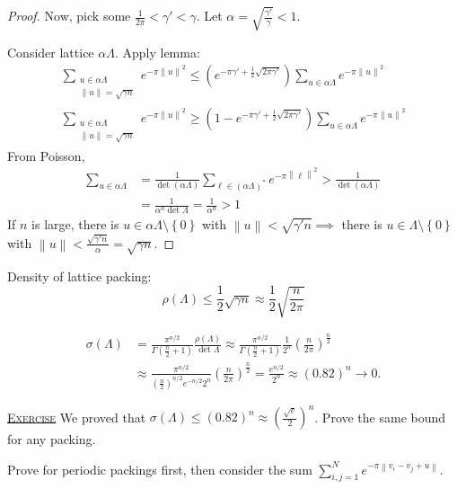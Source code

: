 \documentclass{report}
\newcommand{\norm}[1]{\left\| #1 \right\|}
\newcommand{\set}[1]{\left\{ #1 \right\}}
\newcommand{\fancyem}[1]{\underline{\textsc{#1}}}
\theoremstyle{definition}
\theoremstyle{remark}
\numberwithin{equation}{section}
\begin{document}
\begin{proof}
    Now, pick some $\frac{1}{2\pi} < \gamma' < \gamma$. Let $\alpha = \sqrt{\frac{\gamma'}{\gamma}} < 1$.

    Consider lattice $\alpha\Lambda$. Apply lemma:
    \begin{align*}
        \sum_{\substack{u \in \alpha\Lambda \\ \norm{u} = \sqrt{\gamma n}}} e^{-\pi\norm{u}^2} \leq \left(e^{-\pi\gamma'+\frac{1}{2}\sqrt{2\pi\gamma'}}\right)\sum_{u \in \alpha\Lambda}e^{-\pi\norm{u}^2} \\
        \sum_{\substack{u \in \alpha\Lambda \\ \norm{u} = \sqrt{\gamma n}}} e^{-\pi\norm{u}^2} \geq \left(1 - e^{-\pi\gamma'+\frac{1}{2}\sqrt{2\pi\gamma'}}\right)\sum_{u \in \alpha\Lambda}e^{-\pi\norm{u}^2}
    \end{align*}
    From Poisson, \begin{align*}
        \sum_{u \in \alpha\Lambda} & = \frac{1}{\det (\alpha\Lambda)}\sum_{\ell \in (\alpha\Lambda)^*} e^{-\pi\norm{\ell}^2} > \frac{1}{\det(\alpha\Lambda)}\\
        & = \frac{1}{\alpha^n\det\Lambda} = \frac{1}{\alpha^n} > 1
    \end{align*}
    If $n$ is large, there is $u \in \alpha\Lambda \setminus \set{0}$ with $\norm{u} < \sqrt{\gamma' n} \implies$ there is $u \in \Lambda \setminus \set{0}$ with $\norm{u} < \frac{\sqrt{\gamma'n}}{\alpha} = \sqrt{\gamma n}$.
\end{proof}

Density of lattice packing: 
\[
    \rho(\Lambda) \leq \frac{1}{2}\sqrt{\gamma n} \approx \frac{1}{2}\sqrt{\frac{n}{2\pi}}
\]
    
\begin{align*}
    \sigma(\Lambda) & = \frac{\pi^{n/2}}{\Gamma\left(\frac{n}{2}+1\right)}\frac{\rho(\Lambda)}{\det\Lambda} \approx \frac{\pi^{n/2}}{\Gamma\left(\frac{n}{2}+1\right)}\frac{1}{2^n}\left(\frac{n}{2\pi}\right)^{\frac{n}{2}} \\
    & \approx\frac{\pi^{n/2}}{\left(\frac{n}{2}\right)^{n/2}e^{-n/2}2^n}\left(\frac{n}{2\pi}\right)^{\frac{n}{2}} = \frac{e^{n/2}}{2^n} \approx (0.82)^n \to 0.
\end{align*}

\fancyem{Exercise} We proved that $\sigma(\Lambda) \leq (0.82)^n \approx \left(\frac{\sqrt{e}}{2}\right)^n$. Prove the same bound for any packing.

Prove for periodic packings first, then consider the sum $\sum_{i, j=1}^N e^{-\pi \norm{v_i - v_j + u}}$.
\end{document}
